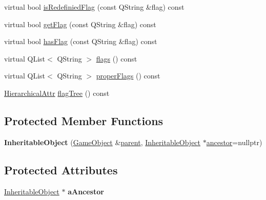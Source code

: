 \begin{DoxyCompactItemize}
\item 
virtual bool \hyperlink{class_inheritable_object_ab691081c80168648c19b60061c1fa148}{is\-Redefinied\-Flag} (const \-Q\-String \&flag) const 
\item 
virtual bool \hyperlink{class_inheritable_object_a2982062433ef52c22a669e29dbc42e65}{get\-Flag} (const \-Q\-String \&flag) const 
\item 
virtual bool \hyperlink{class_inheritable_object_a3c441caeca4fdc82fb1978595561f101}{has\-Flag} (const \-Q\-String \&flag) const 
\item 
virtual \-Q\-List$<$ \-Q\-String $>$ \hyperlink{class_inheritable_object_a2014359fb2260eec0804a0e7be0a6c6d}{flags} () const 
\item 
virtual \-Q\-List$<$ \-Q\-String $>$ \hyperlink{class_inheritable_object_a2b0d98c6f8f69698629a4e4c94c85ba4}{proper\-Flags} () const 
\item 
\hyperlink{gameobject_8h_a2679b210263ad72f002dee6909ea222b}{\-Hierarchical\-Attr} \hyperlink{class_inheritable_object_a1f5e307cffd3b9d3fc4c4d00079361f7}{flag\-Tree} () const 
\end{DoxyCompactItemize}
\subsection*{\-Protected \-Member \-Functions}
\begin{DoxyCompactItemize}
\item 
\hypertarget{class_inheritable_object_af01c47efbda743217889d5e0be652c7b}{{\bfseries \-Inheritable\-Object} (\hyperlink{class_game_object}{\-Game\-Object} \&\hyperlink{class_game_object_af3deaf39cde23c189765634e32e95bb4}{parent}, \hyperlink{class_inheritable_object}{\-Inheritable\-Object} $\ast$\hyperlink{class_inheritable_object_ac87a3c55ca4be252c527a29fe162bb15}{ancestor}=nullptr)}\label{class_inheritable_object_af01c47efbda743217889d5e0be652c7b}

\end{DoxyCompactItemize}
\subsection*{\-Protected \-Attributes}
\begin{DoxyCompactItemize}
\item 
\hypertarget{class_inheritable_object_a985dc4856beac7cd6bbd3a2f534e42ff}{\hyperlink{class_inheritable_object}{\-Inheritable\-Object} $\ast$ {\bfseries a\-Ancestor}}\label{class_inheritable_object_a985dc4856beac7cd6bbd3a2f534e42ff}

\end{DoxyCompactItemize}


